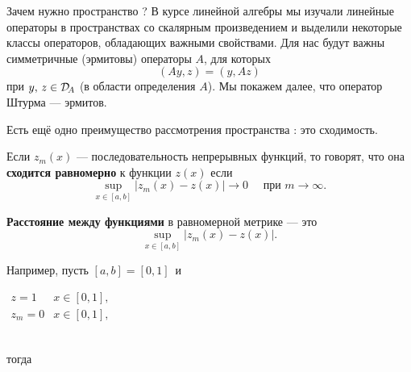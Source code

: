 Зачем нужно пространство \fL[(a,b)]? В курсе линейной алгебры \cite{linalg} мы изучали линейные операторы в пространствах со скалярным произведением и выделили некоторые классы операторов, обладающих важными свойствами. Для нас будут важны симметричные (эрмитовы) операторы $A$, для которых
\begin{equation*}
	 (Ay,z)=(y,Az)
\end{equation*} 
при $y,\,z\in\mathcal{D}_{\!A}$ {\mb(в области определения $A$)}. Мы покажем далее, что оператор Штурма --- эрмитов.

Есть ещё одно преимущество рассмотрения пространства \fL[(a,b)]{}: это сходимость. 
\begin{Def}
	Если $z_m(x)$ --- последовательность непрерывных функций, то говорят, что она \textbf{сходится равномерно} к функции $z(x)$ если
	\begin{equation*}
		\sup\limits_{x\in[a,b]}|z_m(x)-z(x)|\to0\quad\text{ при }m\to\infty.
	\end{equation*}
\end{Def}   
\begin{Def}
	\textbf{Расстояние между функциями }в равномерной метрике --- это
	\begin{equation*}
		\sup\limits_{x\in[a,b]}|z_m(x)-z(x)|.
	\end{equation*}
\end{Def}
\noindent Например, пусть $[a,b]=[0,1]$\ и

{\noindent\centering\parbox[t]{0.5\textwidth}{\centering
	$\begin{array}{ll}
		z=1&x\in[0,1],\\
		z_m=0&x\in[0,1],
	\end{array}$} 
}\\
\noindent тогда

